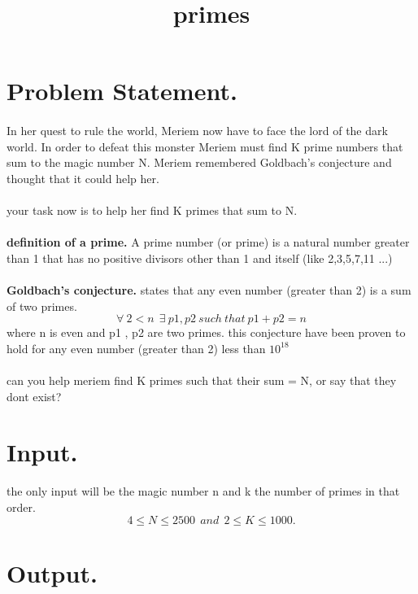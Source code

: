 \documentclass[10pt]{article}
\begin{document}
\title{primes}
 \date{}
\maketitle

\section{Problem Statement.}
\paragraph{}
In her quest to rule the world, Meriem now have to face the lord of the dark world.
In order to defeat this monster Meriem must find K prime numbers that sum to the
magic number N. Meriem remembered Goldbach's conjecture and thought that it could help her.
\paragraph{}
your task now is to help her find K primes that sum to N.
\paragraph{}
\textbf{definition of a prime.}
A prime number (or prime) is a natural number greater than 1 that has no positive divisors other than 1 and itself
(like 2,3,5,7,11 ...)
\paragraph{}
\textbf{Goldbach's conjecture.} states that any even number (greater than 2) is a sum of two primes.
$$ \forall\ 2<n\ \ \exists\  p1,p2\ such\ that\  p1+p2=n $$
where n is even and p1 , p2 are two primes. 
this conjecture have been proven to hold for any even number (greater than 2) less than $10^{18}$
\paragraph{}
can you help meriem find K primes such that their sum = N, or say that they dont exist?
\section{Input.}
the only input will be the magic number n and k the number of primes in that order.
$$4\le N \le 2500\ \  and\ \  2 \le K \le 1000.$$

\section{Output.}
\end{document}
